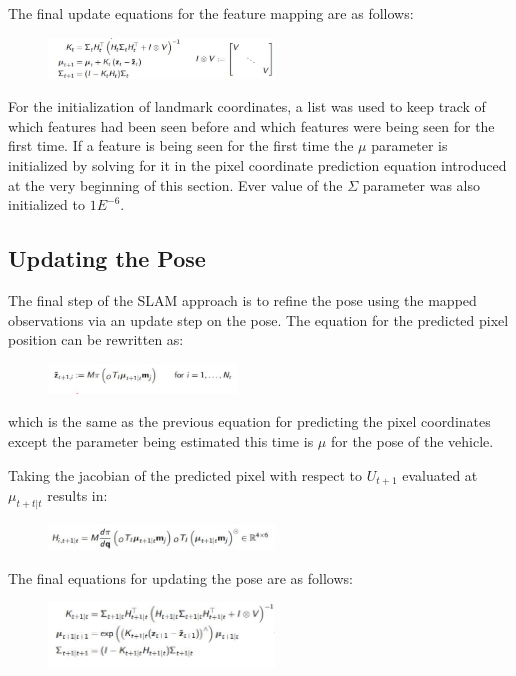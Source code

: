 \documentclass[conference]{IEEEtran}
\begin{document}
The final update equations for the feature mapping are as follows:

\begin{figure}[H]
\centerline{\includegraphics[width=60mm]{eqns/eq20.jpg}}
\end{figure} 

For the initialization of landmark coordinates, a list was used to keep track of which features had been seen before and which features were being seen for the first time. If a feature is being seen for the first time the $\mu$ parameter is initialized by solving for it in the pixel coordinate prediction equation introduced at the very beginning of this section. Ever value of the $\Sigma$ parameter was also initialized to $1E^{-6}$. 
\subsection{Updating the Pose}

The final step of the SLAM approach is to refine the pose using the mapped observations via an update step on the pose. The equation for the predicted pixel position can be rewritten as:

\begin{figure}[H]
\centerline{\includegraphics[width=50mm]{eqns/eq14.jpg}}
\end{figure} 

which is the same as the previous equation for predicting the pixel coordinates except the parameter being estimated this time is $\mu$ for the pose of the vehicle.

Taking the jacobian of the predicted pixel with respect to $U_{t+1}$ evaluated at $\mu_{t+t|t}$ results in:

\begin{figure}[H]
\centerline{\includegraphics[width=60mm]{eqns/eq11.jpg}}
\end{figure} 

The final equations for updating the pose are as follows:

\begin{figure}[H]
\centerline{\includegraphics[width=60mm]{eqns/eq12.jpg}}
\end{figure} 
\end{document}
